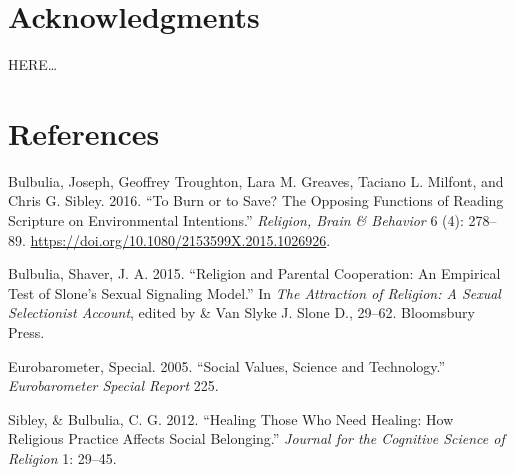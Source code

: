 \documentclass[
  singlecolumn]{report}
\newlength{\cslhangindent}
\newlength{\cslentryspacingunit} %
\newenvironment{CSLReferences}[2] %
 {%
  \setlength{\parindent}{0pt}
  \ifodd #1
  \let\oldpar\par
  \def\par{\hangindent=\cslhangindent\oldpar}
  \fi
  \setlength{\parskip}{#2\cslentryspacingunit}
 }%
 {}
\begin{document}
\hypertarget{acknowledgments}{%
\section{Acknowledgments}\label{acknowledgments}}

HERE\ldots{}

\hypertarget{references}{%
\section{References}\label{references}}

\hypertarget{refs}{}
\begin{CSLReferences}{1}{0}
\leavevmode{}%
Bulbulia, Joseph, Geoffrey Troughton, Lara M. Greaves, Taciano L.
Milfont, and Chris G. Sibley. 2016. {``To Burn or to Save? The Opposing
Functions of Reading Scripture on Environmental Intentions.''}
\emph{Religion, Brain \& Behavior} 6 (4): 278--89.
\url{https://doi.org/10.1080/2153599X.2015.1026926}.

\leavevmode{}%
Bulbulia, Shaver, J. A. 2015. {``Religion and Parental Cooperation: An
Empirical Test of Slone's Sexual Signaling Model.''} In \emph{The
Attraction of Religion: A Sexual Selectionist Account}, edited by \& Van
Slyke J. Slone D., 29--62. Bloomsbury Press.

\leavevmode{}%
Eurobarometer, Special. 2005. {``Social Values, Science and
Technology.''} \emph{Eurobarometer Special Report} 225.

\leavevmode{}%
Sibley, \& Bulbulia, C. G. 2012. {``Healing Those Who Need Healing: How
Religious Practice Affects Social Belonging.''} \emph{Journal for the
Cognitive Science of Religion} 1: 29--45.

\end{CSLReferences}
\end{document}
